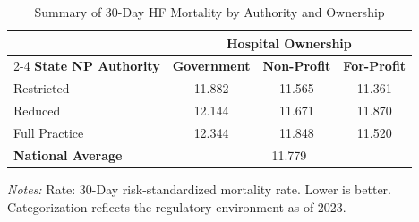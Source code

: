 \begin{table}[htbp]
    \centering
    \caption{Summary of 30-Day HF Mortality by Authority and Ownership}
    \label{tab:mortality_rate_hf_own}
    \vspace{0.2cm}
    \begin{tabular}{lccc}
        \toprule
        & \multicolumn{3}{c}{\textbf{Hospital Ownership}} \\
        \cmidrule(lr){2-4}
        \textbf{State NP Authority} & \textbf{Government} & \textbf{Non-Profit} & \textbf{For-Profit} \\
        \midrule
        Restricted & 11.882 & 11.565 & 11.361 \\
        Reduced & 12.144 & 11.671 & 11.870 \\
        Full Practice & 12.344 & 11.848 & 11.520 \\
        \midrule
        \textbf{National Average} & \multicolumn{3}{c}{11.779} \\
        \bottomrule
    \end{tabular}
    \vspace{0.1cm}
    \begin{minipage}{0.85\textwidth}
        \footnotesize \textit{Notes:} Rate: 30-Day risk-standardized mortality rate. Lower is better. Categorization reflects the regulatory environment as of 2023.
    \end{minipage}
\end{table}